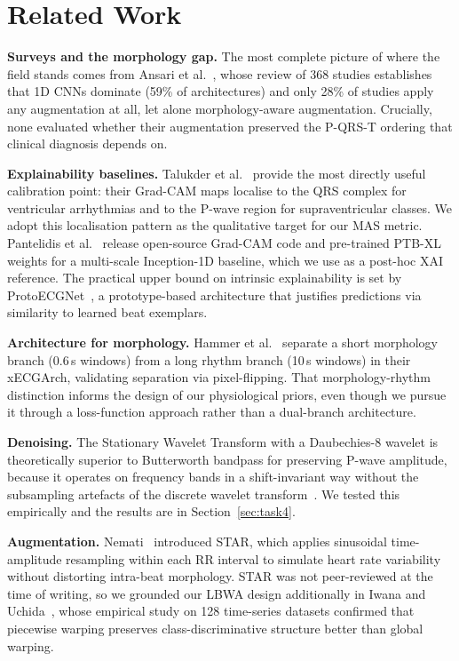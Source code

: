 \documentclass{article}
\begin{document}
\section{Related Work}

\textbf{Surveys and the morphology gap.}
The most complete picture of where the field stands comes from
Ansari et al.~\cite{ansari2023}, whose review of 368 studies
establishes that 1D CNNs dominate (59\% of architectures) and only
28\% of studies apply any augmentation at all, let alone
morphology-aware augmentation. Crucially, none evaluated whether
their augmentation preserved the P-QRS-T ordering that clinical
diagnosis depends on.

\textbf{Explainability baselines.}
Talukder et al.~\cite{talukder2025} provide the most directly useful
calibration point: their Grad-CAM maps localise to the QRS complex
for ventricular arrhythmias and to the P-wave region for
supraventricular classes. We adopt this localisation pattern as the
qualitative target for our MAS metric. Pantelidis et
al.~\cite{pantelidis2025} release open-source Grad-CAM code and
pre-trained PTB-XL weights for a multi-scale Inception-1D baseline,
which we use as a post-hoc XAI reference. The practical upper bound
on intrinsic explainability is set by ProtoECGNet~\cite{sethi2025},
a prototype-based architecture that justifies predictions via
similarity to learned beat exemplars.

\textbf{Architecture for morphology.}
Hammer et al.~\cite{hammer2024} separate a short morphology branch
(0.6\,s windows) from a long rhythm branch (10\,s windows) in their
xECGArch, validating separation via pixel-flipping. That
morphology-rhythm distinction informs the design of our physiological
priors, even though we pursue it through a loss-function approach
rather than a dual-branch architecture.

\textbf{Denoising.}
The Stationary Wavelet Transform with a Daubechies-8 wavelet
is theoretically superior to Butterworth bandpass for preserving
P-wave amplitude, because it operates on frequency bands in a
shift-invariant way without the subsampling artefacts of the
discrete wavelet transform~\cite{addison2005,lee2019}. We tested
this empirically and the results are in Section~\ref{sec:task4}.

\textbf{Augmentation.}
Nemati~\cite{nemati2025} introduced STAR, which applies sinusoidal
time-amplitude resampling within each RR interval to simulate heart
rate variability without distorting intra-beat morphology. STAR
was not peer-reviewed at the time of writing, so we grounded our
LBWA design additionally in Iwana and Uchida~\cite{iwana2021}, whose
empirical study on 128 time-series datasets confirmed that piecewise
warping preserves class-discriminative structure better than global
warping.
\end{document}
